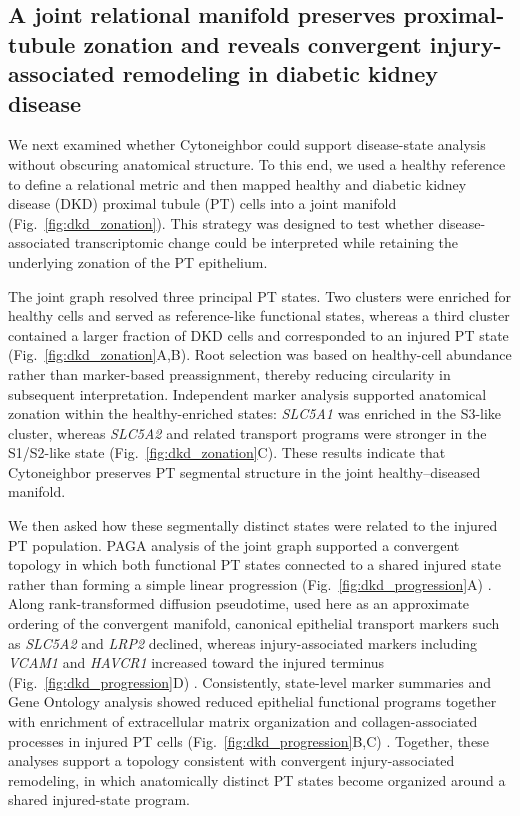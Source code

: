 \documentclass[11pt]{article}
\begin{document}
\subsection{A joint relational manifold preserves proximal-tubule zonation and reveals convergent injury-associated remodeling in diabetic kidney disease}

We next examined whether Cytoneighbor could support disease-state analysis without obscuring anatomical structure. To this end, we used a healthy reference to define a relational metric and then mapped healthy and diabetic kidney disease (DKD) proximal tubule (PT) cells into a joint manifold (Fig.~\ref{fig:dkd_zonation}). This strategy was designed to test whether disease-associated transcriptomic change could be interpreted while retaining the underlying zonation of the PT epithelium.

The joint graph resolved three principal PT states. Two clusters were enriched for healthy cells and served as reference-like functional states, whereas a third cluster contained a larger fraction of DKD cells and corresponded to an injured PT state (Fig.~\ref{fig:dkd_zonation}A,B). Root selection was based on healthy-cell abundance rather than marker-based preassignment, thereby reducing circularity in subsequent interpretation. Independent marker analysis supported anatomical zonation within the healthy-enriched states: \textit{SLC5A1} was enriched in the S3-like cluster, whereas \textit{SLC5A2} and related transport programs were stronger in the S1/S2-like state (Fig.~\ref{fig:dkd_zonation}C)\cite{Muto2021Kidney,Limbutara2020ProteomicsTubule}. These results indicate that Cytoneighbor preserves PT segmental structure in the joint healthy--diseased manifold.

We then asked how these segmentally distinct states were related to the injured PT population. PAGA analysis of the joint graph supported a convergent topology in which both functional PT states connected to a shared injured state rather than forming a simple linear progression (Fig.~\ref{fig:dkd_progression}A) \cite{Wolf2019PAGA}. Along rank-transformed diffusion pseudotime, used here as an approximate ordering of the convergent manifold, canonical epithelial transport markers such as \textit{SLC5A2} and \textit{LRP2} declined, whereas injury-associated markers including \textit{VCAM1} and \textit{HAVCR1} increased toward the injured terminus (Fig.~\ref{fig:dkd_progression}D) \cite{Haghverdi2016DPT,Wilson2022DKD,Wu2022SGLT2iDKD}. Consistently, state-level marker summaries and Gene Ontology analysis showed reduced epithelial functional programs together with enrichment of extracellular matrix organization and collagen-associated processes in injured PT cells (Fig.~\ref{fig:dkd_progression}B,C) \cite{Kuppe2021KidneyFibrosis,Li2022KidneyFibrosisInjury,Lake2023KidneyAtlas}. Together, these analyses support a topology consistent with convergent injury-associated remodeling, in which anatomically distinct PT states become organized around a shared injured-state program.
\end{document}
